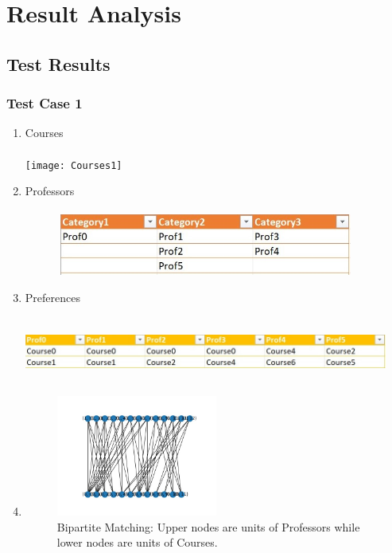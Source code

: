\chapter{Result Analysis}
\section{Test Results}
\subsection{Test Case 1}
\begin{enumerate}
    \item Courses \\ \\ 
    \texttt{[image: Courses1]}
    \item Professors \\ \\ 
    \includegraphics[width=12cm, height=2cm]{images/Professors1.jpeg}
    \item Preferences \\ \\
    \includegraphics[width=12cm, height=2cm]{images/Preferences1.jpeg}
    \item
    \begin{figure}[h]
    \centering
    \caption{Bipartite Matching: Upper nodes are units of Professors while lower nodes are units of Courses.}
    \includegraphics[width=0.5\textwidth]{images/Graph1.jpeg}
    \end{figure}\\

\end{enumerate}
